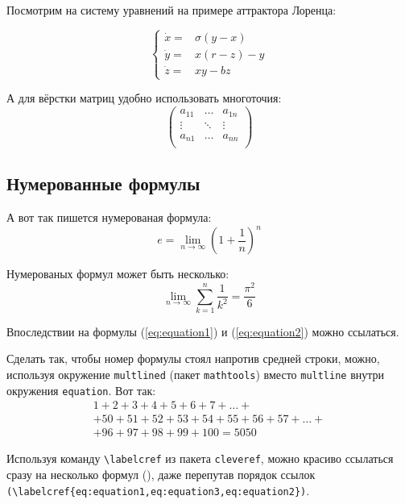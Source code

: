 Посмотрим на систему уравнений на примере аттрактора Лоренца:

\[ 
\left\{
  \begin{array}{rl}
    \dot x = & \sigma (y-x) \\
    \dot y = & x (r - z) - y \\
    \dot z = & xy - bz
  \end{array}
\right.
\]

А для вёрстки матриц удобно использовать многоточия:
\[ 
\left(
  \begin{array}{ccc}
  	a_{11} & \ldots & a_{1n} \\
  	\vdots & \ddots & \vdots \\
  	a_{n1} & \ldots & a_{nn} \\
  \end{array}
\right)
\]


\subsection{Нумерованные формулы} \label{subsect1_3_3}

А вот так пишется нумерованая формула:
\begin{equation}
  \label{eq:equation1}
  e = \lim_{n \to \infty} \left( 1+\frac{1}{n} \right) ^n
\end{equation}

Нумерованых формул может быть несколько:
\begin{equation}
  \label{eq:equation2}
  \lim_{n \to \infty} \sum_{k=1}^n \frac{1}{k^2} = \frac{\pi^2}{6}
\end{equation}

Впоследствии на формулы (\ref{eq:equation1}) и (\ref{eq:equation2}) можно ссылаться.

Сделать так, чтобы номер формулы стоял напротив средней строки, можно, используя окружение \verb|multlined| (пакет \verb|mathtools|) вместо \verb|multline| внутри окружения \verb|equation|. Вот так:
\begin{equation} %
  \label{eq:equation3}
    \begin{multlined}
        1+ 2+3+4+5+6+7+\dots + \\ 
        + 50+51+52+53+54+55+56+57 + \dots + \\ 
        + 96+97+98+99+100=5050 
    \end{multlined}
\end{equation}

Используя команду \verb|\labelcref| из пакета \verb|cleveref|, можно
красиво ссылаться сразу на несколько формул
(), даже перепутав
порядок ссылок \verb|(\labelcref{eq:equation1,eq:equation3,eq:equation2})|.

